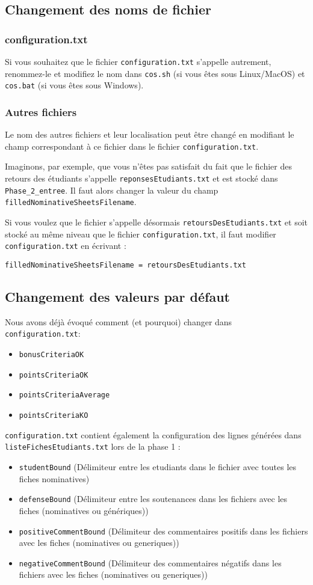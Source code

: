 \documentclass[11pt]{article}
\begin{document}
\subsection{Changement des noms de fichier}
\label{sec-7-1}
\subsubsection{configuration.txt}
\label{sec-7-1-1}
Si vous souhaitez que le fichier \verb~configuration.txt~ s'appelle
autrement, renommez-le et modifiez le nom dans \verb~cos.sh~ (si vous êtes
sous Linux/MacOS) et \verb~cos.bat~ (si vous êtes sous Windows).
\subsubsection{Autres fichiers}
\label{sec-7-1-2}
Le nom des autres fichiers et leur localisation peut être changé en
modifiant le champ correspondant à ce fichier dans le fichier
\verb~configuration.txt~.

Imaginons, par exemple, que vous n'êtes pas satisfait du fait que le
fichier des retours des étudiants s'appelle \verb~reponsesEtudiants.txt~ et
est stocké dans \verb~Phase_2_entree~. Il faut alors changer la valeur du
champ \verb~filledNominativeSheetsFilename~.

Si vous voulez que le fichier s'appelle désormais
\verb~retoursDesEtudiants.txt~ et soit stocké au même niveau que le fichier
\verb~configuration.txt~, il faut modifier \verb~configuration.txt~ en écrivant :

\verb~filledNominativeSheetsFilename = retoursDesEtudiants.txt~
\subsection{Changement des valeurs par défaut}
\label{sec-7-2}
Nous avons déjà évoqué comment (et pourquoi) changer dans
\verb~configuration.txt~:
\begin{itemize}
\item \verb~bonusCriteriaOK~
\item \verb~pointsCriteriaOK~
\item \verb~pointsCriteriaAverage~
\item \verb~pointsCriteriaKO~
\end{itemize}

\verb~configuration.txt~ contient également la configuration des lignes
générées dans \verb~listeFichesEtudiants.txt~ lors de la phase 1 :
\begin{itemize}
\item \verb~studentBound~ (Délimiteur entre les etudiants dans le fichier avec
toutes les fiches nominatives)
\item \verb~defenseBound~ (Délimiteur entre les soutenances dans les fichiers
avec les fiches (nominatives ou génériques))
\item \verb~positiveCommentBound~ (Délimiteur des commentaires positifs dans
les fichiers avec les fiches (nominatives ou generiques))
\item \verb~negativeCommentBound~ (Délimiteur des commentaires négatifs dans
les fichiers avec les fiches (nominatives ou generiques))
\end{itemize}
\end{document}
